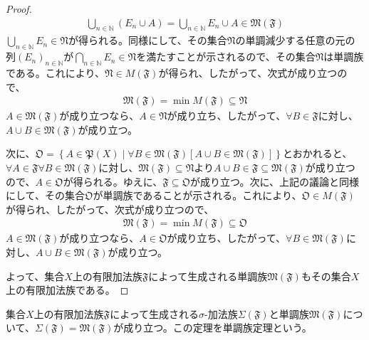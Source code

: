 \documentclass[dvipdfmx]{jsarticle}
\begin{document}
\begin{proof}
\begin{align*}
\bigcup_{n \in \mathbb{N}} \left( E_{n} \cup A \right) = \bigcup_{n \in \mathbb{N}} E_{n} \cup A \in \mathfrak{M}\left( \mathfrak{F} \right)
\end{align*}
$\bigcup_{n \in \mathbb{N}} E_{n}\in \mathfrak{N}$が得られる。同様にして、その集合$\mathfrak{N}$の単調減少する任意の元の列$\left( E_{n} \right)_{n \in \mathbb{N}}$が$\bigcap_{n \in \mathbb{N}} E_{n}\in \mathfrak{N}$を満たすことが示されるので、その集合$\mathfrak{N}$は単調族である。これにより、$\mathfrak{N \in}M\left( \mathfrak{F} \right)$が得られ、したがって、次式が成り立つので、
\begin{align*}
\mathfrak{M}\left( \mathfrak{F} \right) = \min{M\left( \mathfrak{F} \right)}\subseteq \mathfrak{N}
\end{align*}
$A\in \mathfrak{M}\left( \mathfrak{F} \right)$が成り立つなら、$A\in \mathfrak{N}$が成り立ち、したがって、$\forall B\in \mathfrak{F}$に対し、$A \cup B\in \mathfrak{M}\left( \mathfrak{F} \right)$が成り立つ。\par
次に、$\mathfrak{O} = \left\{ A\in \mathfrak{P}(X) \middle| \forall B\in \mathfrak{M}\left( \mathfrak{F} \right)\left[ A \cup B\in \mathfrak{M}\left( \mathfrak{F} \right) \right] \right\}$とおかれると、$\forall A\in \mathfrak{F\forall}B\in \mathfrak{M}\left( \mathfrak{F} \right)$に対し、$\mathfrak{M}\left( \mathfrak{F} \right)\subseteq \mathfrak{N}$より$A \cup B\in \mathfrak{F \subseteq M}\left( \mathfrak{F} \right)$が成り立つので、$A\in \mathfrak{O}$が得られる。ゆえに、$\mathfrak{F \subseteq O}$が成り立つ。次に、上記の議論と同様にして、その集合$\mathfrak{O}$が単調族であることが示される。これにより、$\mathfrak{O \in}M\left( \mathfrak{F} \right)$が得られ、したがって、次式が成り立つので、
\begin{align*}
\mathfrak{M}\left( \mathfrak{F} \right) = \min{M\left( \mathfrak{F} \right)}\subseteq \mathfrak{O}
\end{align*}
$A\in \mathfrak{M}\left( \mathfrak{F} \right)$が成り立つなら、$A\in \mathfrak{O}$が成り立ち、したがって、$\forall B\in \mathfrak{M}\left( \mathfrak{F} \right)$に対し、$A \cup B \in \mathfrak{M}\left( \mathfrak{F} \right)$が成り立つ。\par
よって、集合$X$上の有限加法族$\mathfrak{F}$によって生成される単調族$\mathfrak{M}\left( \mathfrak{F} \right)$もその集合$X$上の有限加法族である。
\end{proof}
\begin{thm}[単調族定理]\label{4.5.6.8}
集合$X$上の有限加法族$\mathfrak{F}$によって生成される$\sigma$-加法族$\varSigma\left( \mathfrak{F} \right)$と単調族$\mathfrak{M}\left( \mathfrak{F} \right)$について、$\varSigma\left( \mathfrak{F} \right) = \mathfrak{M}\left( \mathfrak{F} \right)$が成り立つ。この定理を単調族定理という。
\end{thm}
\end{document}

